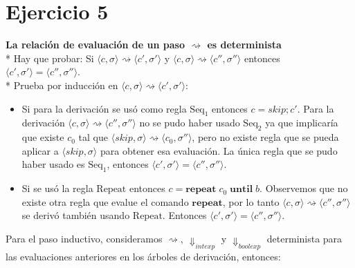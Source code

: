\documentclass[12pt,a4paper]{article}
\begin{document}
\section*{Ejercicio 5}
\textbf{La relaci\'on de evaluaci\'on de un paso
$\rightsquigarrow$ es determinista} \\*
Hay que probar: Si $\langle c, \sigma \rangle \rightsquigarrow
\langle c', \sigma' \rangle$ y $\langle c, \sigma \rangle \rightsquigarrow
\langle c'', \sigma'' \rangle$ entonces
$\langle c', \sigma' \rangle = \langle c'', \sigma'' \rangle$. \\*
Prueba por inducci\'on en $\langle c, \sigma \rangle \rightsquigarrow
\langle c', \sigma' \rangle$:
\begin{itemize}
\item Si para la derivaci\'on se us\'o como regla $\mathrm{Seq_{1}}$
    entonces $c = skip; c'$. Para la derivaci\'on $\langle c,\sigma
    \rangle \rightsquigarrow \langle c'',\sigma'' \rangle$ no se
    pudo haber usado $\mathrm{Seq_{2}}$ ya que implicar\'ia que
    existe $c_{0}$ tal que $\langle skip,\sigma \rangle \rightsquigarrow
    \langle c_{0},\sigma'' \rangle$, pero no existe regla que se pueda
    aplicar a $\langle skip, \sigma \rangle$ para obtener esa evaluaci\'on. 
    La \'unica regla que se pudo haber usado es $\mathrm{Seq_{1}}$,
    entonces $\langle c',\sigma' \rangle = \langle c'',\sigma'' \rangle$.
\item Si se us\'o la regla $\mathrm{Repeat}$ entonces $c = \textbf{repeat}
    \;c_{0}\;\textbf{until}\;b$. Observemos que no existe otra regla que evalue
    el comando $\textbf{repeat}$, por lo tanto $\langle c,\sigma \rangle
    \rightsquigarrow \langle c'',\sigma'' \rangle$ se deriv\'o tambi\'en
    usando $\mathrm{Repeat}$. Entonces $\langle c',\sigma' \rangle =
    \langle c'',\sigma'' \rangle$.
\end{itemize}
Para el paso inductivo, consideramos $\rightsquigarrow$, $\Downarrow_{intexp}$
y $\Downarrow_{boolexp}$ determinista para las evaluaciones anteriores en los
\'arboles de derivaci\'on, entonces:
\end{document}
